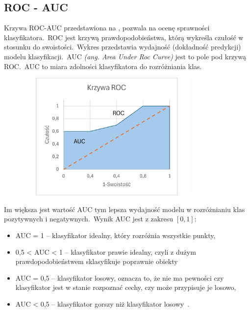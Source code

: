 \subsection{ROC - AUC}
Krzywa ROC-AUC przedstawiona na , pozwala na ocenę sprawności klasyfikatora.\ ROC jest krzywą prawdopodobieństwa, którą wykreśla czułość w stosunku do swoistości.\ Wykres przedstawia wydajność (dokładność predykcji) modelu klasyfikacji.\ AUC \textit{(ang. Area Under Roc Curve)} jest to pole pod krzywą ROC.\ AUC to miara zdolności klasyfikatora do rozróżniania klas.

\begin{figure}[H]
    \centering
    \includegraphics[width=0.8\textwidth]{images/roc-auc}
    \label{fig:roc-auc}
\end{figure}

Im większa jest wartość AUC tym lepsza wydajność modelu w rozróżnianiu klas pozytywnych i negatywnych.\ Wynik AUC jest z zakresu $[0, 1]$:
\begin{itemize}
    \item AUC = 1 -- klasyfikator idealny, który rozróżnia wszystkie punkty,
    \item 0,5 < AUC < 1 -- klasyfikator prawie idealny, czyli z dużym prawdopodobieństwem sklasyfikuje poprawnie obiekty
    \item AUC = 0,5 -- klasyfikator losowy, oznacza to, że nie ma pewności czy klasyfikator jest w stanie rozpoznać cechy, czy może przypisuje je losowo,
    \item AUC < 0,5 -- klasyfikator gorszy niż klasyfikator losowy~\cite{Algolytics, Agrawal2024}.
\end{itemize}